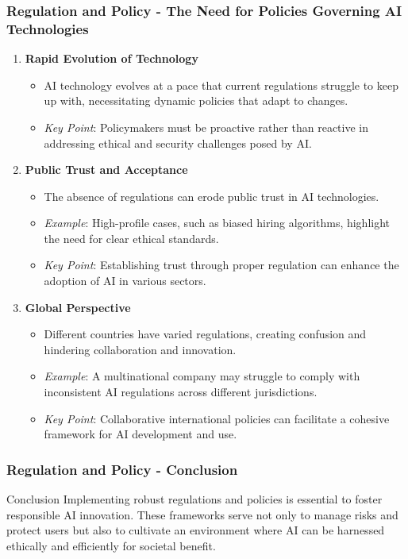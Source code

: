 \documentclass[aspectratio=169]{beamer}
\begin{document}
\begin{frame}[fragile]
    \frametitle{Regulation and Policy - The Need for Policies Governing AI Technologies}
    \begin{enumerate}
        \item \textbf{Rapid Evolution of Technology}
            \begin{itemize}
                \item AI technology evolves at a pace that current regulations struggle to keep up with, necessitating dynamic policies that adapt to changes.
                \item \textit{Key Point}: Policymakers must be proactive rather than reactive in addressing ethical and security challenges posed by AI.
            \end{itemize}
        
        \item \textbf{Public Trust and Acceptance}
            \begin{itemize}
                \item The absence of regulations can erode public trust in AI technologies.
                \item \textit{Example}: High-profile cases, such as biased hiring algorithms, highlight the need for clear ethical standards.
                \item \textit{Key Point}: Establishing trust through proper regulation can enhance the adoption of AI in various sectors.
            \end{itemize}
        
        \item \textbf{Global Perspective}
            \begin{itemize}
                \item Different countries have varied regulations, creating confusion and hindering collaboration and innovation.
                \item \textit{Example}: A multinational company may struggle to comply with inconsistent AI regulations across different jurisdictions.
                \item \textit{Key Point}: Collaborative international policies can facilitate a cohesive framework for AI development and use.
            \end{itemize}
    \end{enumerate}
\end{frame}

\begin{frame}[fragile]
    \frametitle{Regulation and Policy - Conclusion}
    \begin{block}{Conclusion}
        Implementing robust regulations and policies is essential to foster responsible AI innovation. These frameworks serve not only to manage risks and protect users but also to cultivate an environment where AI can be harnessed ethically and efficiently for societal benefit.
    \end{block}
\end{frame}
\end{document}
